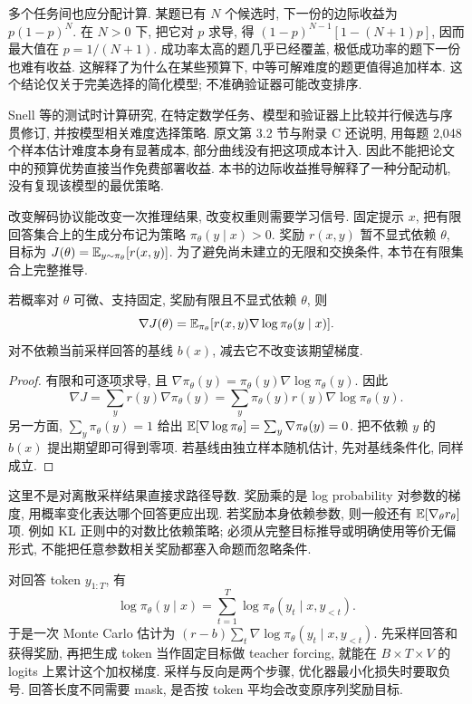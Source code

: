 多个任务间也应分配计算. 某题已有 $N$ 个候选时, 下一份的边际收益为 $p(1-p)^N$. 在 $N>0$ 下, 把它对 $p$ 求导, 得 $(1-p)^{N-1}[1-(N+1)p]$, 因而最大值在 $p=1/(N+1)$. 成功率太高的题几乎已经覆盖, 极低成功率的题下一份也难有收益. 这解释了为什么在某些预算下, 中等可解难度的题更值得追加样本. 这个结论仅关于完美选择的简化模型; 不准确验证器可能改变排序.

Snell 等的测试时计算研究, 在特定数学任务、模型和验证器上比较并行候选与序贯修订, 并按模型相关难度选择策略\cite{testcompute}. 原文第 3.2 节与附录 C 还说明, 用每题 2,048 个样本估计难度本身有显著成本, 部分曲线没有把这项成本计入. 因此不能把论文中的预算优势直接当作免费部署收益. 本书的边际收益推导解释了一种分配动机, 没有复现该模型的最优策略.

\label{sec:reason-policygradient}
改变解码协议能改变一次推理结果, 改变权重则需要学习信号. 固定提示 $x$, 把有限回答集合上的生成分布记为策略 $\pi_\theta(y\mid x)>0$. 奖励 $r(x,y)$ 暂不显式依赖 $\theta$, 目标为 $J(\theta)=\mathbb E_{y\sim\pi_\theta}[r(x,y)]$. 为了避免尚未建立的无限和交换条件, 本节在有限集合上完整推导.

\begin{proposition}\label{prop:score-gradient}
若概率对 $\theta$ 可微、支持固定, 奖励有限且不显式依赖 $\theta$, 则
\[
\nabla J(\theta)=\mathbb E_{\pi_\theta}[r(x,y)\nabla\log\pi_\theta(y\mid x)].
\]
对不依赖当前采样回答的基线 $b(x)$, 减去它不改变该期望梯度.
\end{proposition}
\begin{proof}
有限和可逐项求导, 且 $\nabla\pi_\theta(y)=\pi_\theta(y)\nabla\log\pi_\theta(y)$. 因此
\[
\nabla J=\sum_yr(y)\nabla\pi_\theta(y)
=\sum_y\pi_\theta(y)r(y)\nabla\log\pi_\theta(y).
\]
另一方面, $\sum_y\pi_\theta(y)=1$ 给出 $\mathbb E[\nabla\log\pi_\theta]=\sum_y\nabla\pi_\theta(y)=0$. 把不依赖 $y$ 的 $b(x)$ 提出期望即可得到零项. 若基线由独立样本随机估计, 先对基线条件化, 同样成立.
\end{proof}
这里不是对离散采样结果直接求路径导数. 奖励乘的是 log probability 对参数的梯度, 用概率变化表达哪个回答更应出现. 若奖励本身依赖参数, 则一般还有 $\mathbb E[\nabla_\theta r_\theta]$ 项. 例如 KL 正则中的对数比依赖策略; 必须从完整目标推导或明确使用等价无偏形式, 不能把任意参数相关奖励都塞入命题而忽略条件.

对回答 token $y_{1:T}$, 有
\[
\log\pi_\theta(y\mid x)=\sum_{t=1}^T\log\pi_\theta(y_t\mid x,y_{<t}).
\]
于是一次 Monte Carlo 估计为 $(r-b)\sum_t\nabla\log\pi_\theta(y_t\mid x,y_{<t})$. 先采样回答和获得奖励, 再把生成 token 当作固定目标做 teacher forcing, 就能在 $B\times T\times V$ 的 logits 上累计这个加权梯度. 采样与反向是两个步骤, 优化器最小化损失时要取负号. 回答长度不同需要 mask, 是否按 token 平均会改变原序列奖励目标.

